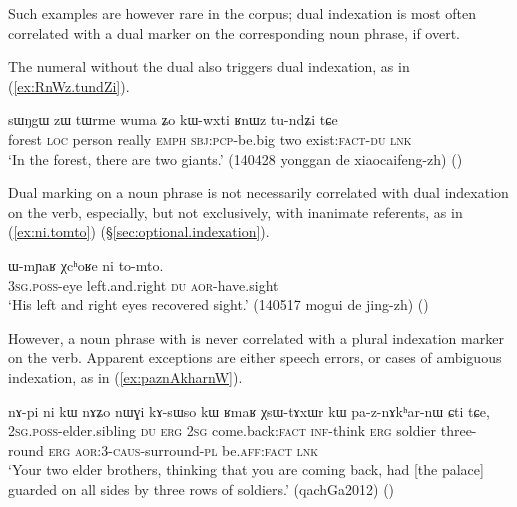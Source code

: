 Such examples are however rare in the corpus; dual indexation is most often correlated with a dual marker on the corresponding noun phrase, if overt.

The numeral  without the dual also triggers dual indexation, as in (\ref{ex:RnWz.tundZi}).

\begin{exe}
\ex \label{ex:RnWz.tundZi}
\gll   sɯŋgɯ zɯ tɯrme wuma ʑo kɯ-wxti ʁnɯz tu-ndʑi tɕe\\
forest \textsc{loc} person really \textsc{emph} \textsc{sbj}:\textsc{pcp}-be.big two exist:\textsc{fact}-\textsc{du} \textsc{lnk}\\
\glt `In the forest, there are two giants.'  (140428 yonggan de xiaocaifeng-zh)
()
\end{exe}

Dual marking on a noun phrase is not necessarily correlated with dual indexation on the verb, especially, but not exclusively, with inanimate referents, as in (\ref{ex:ni.tomto}) (§\ref{sec:optional.indexation}).

\begin{exe}
\ex \label{ex:ni.tomto}
\gll  ɯ-mɲaʁ χcʰoʁe ni to-mto. \\
\textsc{3sg}.\textsc{poss}-eye left.and.right \textsc{du} \textsc{aor}-have.sight \\
\glt `His left and right eyes recovered sight.' (140517 mogui de jing-zh) ()
\end{exe}

However, a noun phrase with  is never correlated with a plural indexation marker on the verb. Apparent exceptions are either speech errors, or cases of ambiguous indexation, as in (\ref{ex:paznAkharnW}).

\begin{exe}
\ex \label{ex:paznAkharnW}
 \gll  nɤ-pi ni kɯ nɤʑo nɯɣi kɤ-sɯso kɯ ʁmaʁ χsɯ-tɤxɯr kɯ pa-z-nɤkʰar-nɯ ɕti tɕe, \\
 \textsc{2sg}.\textsc{poss}-elder.sibling \textsc{du} \textsc{erg} \textsc{2sg} come.back:\textsc{fact} \textsc{inf}-think \textsc{erg} soldier three-round \textsc{erg} \textsc{aor}:3\flobv{}-\textsc{caus}-surround-\textsc{pl} be.\textsc{aff}:\textsc{fact} \textsc{lnk} \\
 \glt `Your two elder brothers, thinking that you are coming back, had [the palace] guarded on all sides by three rows of soldiers.' (qachGa2012)
()
\end{exe}

